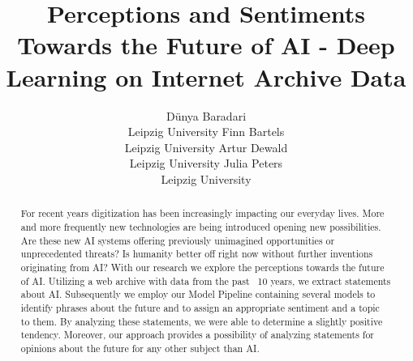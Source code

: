 \documentclass[11pt]{article}
\title{Perceptions and Sentiments Towards the Future of AI - Deep Learning on Internet Archive Data}
\author{
    Dünya Baradari\\Leipzig University\And
    Finn Bartels\\Leipzig University\And
    Artur Dewald\\Leipzig University\And
    Julia Peters\\Leipzig University
}
\begin{document}
\maketitle
\begin{abstract}
For recent years digitization has been increasingly impacting our everyday lives.
More and more frequently new technologies are being introduced opening new possibilities.
Are these new AI systems offering previously unimagined opportunities or unprecedented threats?
Is humanity better off right now without further inventions originating from AI?
With our research we explore  the perceptions towards the future of AI.
Utilizing a web archive with data from the past ~10 years, we extract statements about AI. Subsequently we employ our Model Pipeline containing several models to identify phrases about the future and to assign an appropriate sentiment and a topic to them.
By analyzing these statements, we were able to determine a slightly positive tendency.
Moreover, our approach provides a possibility of analyzing statements for opinions about the future for any other subject than AI.

\end{abstract}

\graphicspath{
              {./figures/}
             }









\onecolumn
\appendix



\end{document}
